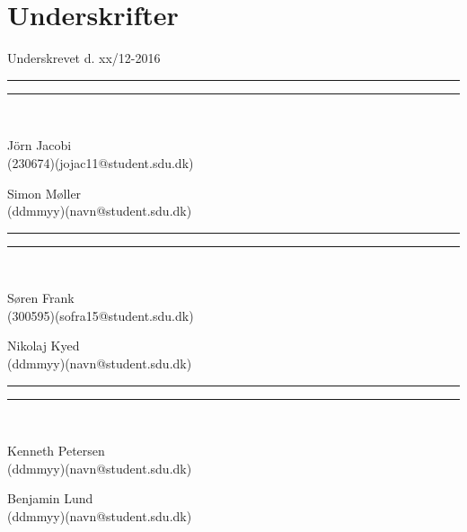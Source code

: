 
\section*{Underskrifter}
\vspace{3ex} \hfill Underskrevet d. xx/12-2016\\

\newlength{\streg} \setlength{\streg}{0.49\linewidth}
\vspace*{\fill} \rule{\streg}{1pt} \hfill \rule{\streg}{1pt}\\
\begin{minipage}[b]{\streg}
 \centering
 \rule{0pt}{4ex}
 J\"{o}rn Jacobi \\
 {\footnotesize (230674)(jojac11@student.sdu.dk)}
\end{minipage}
\hfill
\begin{minipage}[b]{\streg}
 \centering
 Simon Møller \\
 {\footnotesize (ddmmyy)(navn@student.sdu.dk)}
\end{minipage}

\vspace*{\fill} \rule{\streg}{1pt} \hfill \rule{\streg}{1pt}\\
\begin{minipage}[b]{\streg}
 \centering
 \rule{0pt}{4ex}
 Søren Frank \\
 {\footnotesize (300595)(sofra15@student.sdu.dk)}
\end{minipage}
\hfill
\begin{minipage}[b]{\streg}
 \centering
 Nikolaj Kyed \\
 {\footnotesize (ddmmyy)(navn@student.sdu.dk)}
\end{minipage}

\vspace*{\fill} \rule{\streg}{1pt} \hfill \rule{\streg}{1pt}\\
\begin{minipage}[b]{\streg}
	\centering
	\rule{0pt}{4ex}
	Kenneth Petersen \\
	{\footnotesize (ddmmyy)(navn@student.sdu.dk)}
\end{minipage}
\hfill
\begin{minipage}[b]{\streg}
	\centering
	Benjamin Lund \\
	{\footnotesize (ddmmyy)(navn@student.sdu.dk)}
\end{minipage}